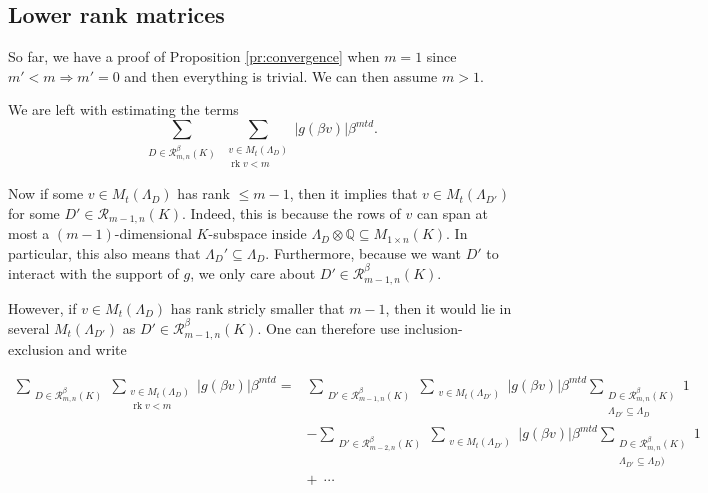 \documentclass{amsart}
\newcommand{\OK}{\mathcal{O}_K}
\DeclareMathOperator{\rank}{rk}
\begin{document}
\fi
\subsection{Lower rank matrices}
\label{se:lower_rank}

So far, we have a proof of Proposition \ref{pr:convergence} when $m=1$ since $m'<m \Rightarrow m' = 0$ and then everything is trivial. We can then assume $m>1$.

We are left with estimating the terms
 \begin{equation}
 \sum_{\substack{D \in \mathcal{R}_{m,n}^{\beta}(K) }}
 \sum_{\substack{v  \in  M_t(\Lambda_D) \\ \rank v < m}} \left|g(\beta v)\right| \beta^{mtd} .
 \end{equation}

\iffalse
 Now if some $v \in M_{t}(\Lambda_D)$ has rank $\leq m-1$, then it implies that $v \in M_{t}(\Lambda_{D'})$ for some $D' \in \mathcal{R}_{m-1,n}(K)$. Indeed, this is because the rows of $v$ can span at most a $( m-1 )$-dimensional $K$-subspace inside $\Lambda_D \otimes \mathbb{Q} \subseteq M_{1 \times n}(K)$. In particular, this also means that $\Lambda_D'\subseteq \Lambda_{D}$.
 Furthermore, because we want $D'$ to interact with the support of $g$, we only care about $D' \in \mathcal{R}^{\beta}_{m-1,n}(K)$.

However, if $v \in M_{t}(\Lambda_D)$ has 
rank stricly smaller that $m-1$, then it would lie in several $M_{t}(\Lambda_{D'})$ as $D' \in \mathcal{R}_{m-1,n}^{\beta}(K)$. One can therefore use inclusion-exclusion and write

 \begin{align}
 \sum_{\substack{D \in \mathcal{R}_{m,n}^{\beta}(K) }}
 \sum_{\substack{v  \in  M_t(\Lambda_{D}) \\ \rank v < m}} \left|g(\beta v)\right| \beta^{mtd} 
 = & 
 \sum_{\substack{D' \in \mathcal{R}^{\beta}_{m-1,n}(K) }}
 \sum_{\substack{v \in M_t(\Lambda_{D'}) }} \left|g(\beta v)\right| \beta^{mtd} 
 \sum_{\substack{D \in \mathcal{R}_{m,n}^{\beta}(K)    \\ \Lambda_{D'} \subseteq \Lambda_D }} 1  \\ 
 & - \sum_{\substack{D' \in \mathcal{R}^{\beta}_{m-2,n}(K) }}
 \sum_{\substack{v \in M_t(\Lambda_{D'}) }} \left|g(\beta v)\right| \beta^{mtd} 
 \sum_{\substack{D \in \mathcal{R}_{m,n}^{\beta}(K)    \\ \Lambda_{D'} \subseteq \Lambda_{D}) }} 1  \\ 
 &  + \ \  \cdots
 \end{align}
\end{document}
